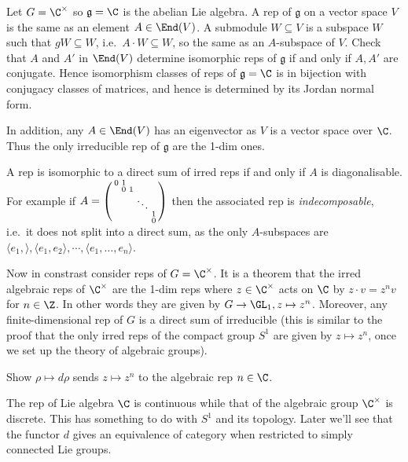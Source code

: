 \documentclass[a4paper]{article}
\newcommand*{\Lie}[1]{\mathfrak{#1}} %
\begin{document}
\begin{eg}
  Let \(G = \C^\times\) so \(\Lie g = \C\) is the abelian Lie algebra. A rep of \(\Lie g\) on a vector space \(V\) is the same as an element \(A \in \End(V)\). A submodule \(W \subseteq V\) is a subspace \(W\) such that \(gW \subseteq W\), i.e.\ \(A \cdot W \subseteq W\), so the same as an \(A\)-subspace of \(V\). Check that \(A\) and \(A'\) in \(\End(V)\) determine isomorphic reps of \(\Lie g\) if and only if \(A, A'\) are conjugate. Hence isomorphism classes of reps of \(\Lie g = \C\) is in bijection with conjugacy classes of matrices, and hence is determined by its Jordan normal form.

  In addition, any \(A \in \End(V)\) has an eigenvector as \(V\) is a vector space over \(\C\). Thus the only irreducible rep of \(\Lie g\) are the 1-dim ones.

  A rep is isomorphic to a direct sum of irred reps if and only if \(A\) is diagonalisable. For example if \(A =
  \begin{psmallmatrix}
    0 & 1 \\
    & 0 & 1 \\
    & & & \ddots \\
    & & & & 1 \\
    & & & & 0
  \end{psmallmatrix}
  \) then the associated rep is \emph{indecomposable}, i.e.\ it does not split into a direct sum, as the only \(A\)-subspaces are \(\langle e_1, \rangle, \langle e_1, e_2 \rangle, \cdots, \langle e_1, \dots, e_n \rangle\).

  Now in constrast consider reps of \(G = \C^\times\). It is a theorem that the irred algebraic reps of \(\C^\times\) are the 1-dim reps where \(z \in \C^\times\) acts on \(\C\) by \(z \cdot v = z^n v\) for \(n \in \Z\). In other words they are given by \(G \to \GL_1, z \mapsto z^n\). Moreover, any finite-dimensional rep of \(G\) is a direct sum of irreducible (this is similar to the proof that the only irred reps of the compact group \(S^1\) are given by \(z \mapsto z^n\), once we set up the theory of algebraic groups).
\end{eg}

\begin{ex}
  Show \(\rho \mapsto d\rho\) sends \(z \mapsto z^n\) to the algebraic rep \(n \in \C\).
\end{ex}

The rep of Lie algebra \(\C\) is continuous while that of the algebraic group \(\C^\times\) is discrete. This has something to do with \(S^1\) and its topology. Later we'll see that the functor \(d\) gives an equivalence of category when restricted to simply connected Lie groups.
\end{document}
